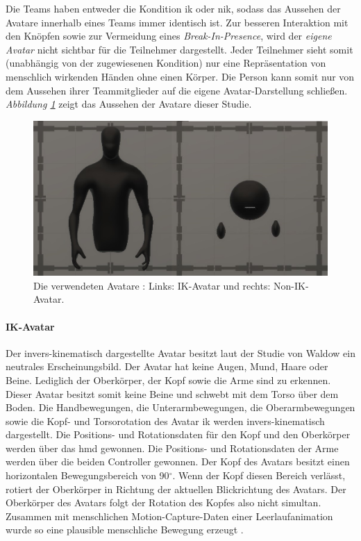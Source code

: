 \documentclass[a4paper,11pt]{article}%
\renewcommand{\\}{\vspace*{0.5\baselineskip} \newline}
\begin{document}
Die Teams haben entweder die Kondition \ac{ik} oder \ac{nik}, sodass das Aussehen der Avatare innerhalb eines Teams immer identisch ist. Zur besseren Interaktion mit den Knöpfen sowie zur Vermeidung eines \textit{Break-In-Presence}, wird der \textit{eigene Avatar} nicht sichtbar für die Teilnehmer dargestellt. Jeder Teilnehmer sieht somit (unabhängig von der zugewiesenen Kondition) nur eine Repräsentation von menschlich wirkenden Händen ohne einen Körper. Die Person kann somit nur von dem Aussehen ihrer Teammitglieder auf die eigene Avatar-Darstellung schließen. \textit{Abbildung \ref{AvatareAussehen}} zeigt das Aussehen der Avatare dieser Studie.

	\begin{figure}[H]
		\begin{footnotesize}
		\centering
			\includegraphics[width=\textwidth]{Abbildungen/Avatars.JPG}	
			\caption[Die verwendeten Avatare]{Die verwendeten Avatare : Links: IK-Avatar und rechts: Non-IK-Avatar.}
			\label{AvatareAussehen}
		\end{footnotesize}
	\end{figure}
	
		\paragraph{IK-Avatar}
Der invers-kinematisch dargestellte Avatar besitzt laut der Studie von Waldow \citep[S. 251]{waldow2019investigating} ein neutrales Erscheinungsbild. Der Avatar hat keine Augen, Mund, Haare oder Beine. Lediglich der Oberkörper, der Kopf sowie die Arme sind zu erkennen. Dieser Avatar besitzt somit keine Beine und schwebt mit dem Torso über dem Boden.
Die Handbewegungen, die Unterarmbewegungen, die Oberarmbewegungen sowie die Kopf- und Torsorotation des Avatar \ac{ik} werden invers-kinematisch dargestellt. Die Positions- und Rotationsdaten für den Kopf und den Oberkörper werden über das \ac{hmd} gewonnen. Die Positions- und Rotationsdaten der Arme werden über die beiden Controller gewonnen. Der Kopf des Avatars besitzt einen horizontalen Bewegungsbereich von 90$^\circ$. Wenn der Kopf diesen Bereich verlässt, rotiert der Oberkörper in Richtung der aktuellen Blickrichtung des Avatars. Der Oberkörper des Avatars folgt der Rotation des Kopfes also nicht simultan. Zusammen mit menschlichen Motion-Capture-Daten einer Leerlaufanimation wurde so eine plausible menschliche Bewegung erzeugt \citep[S. 251]{waldow2019investigating}.
\end{document}
